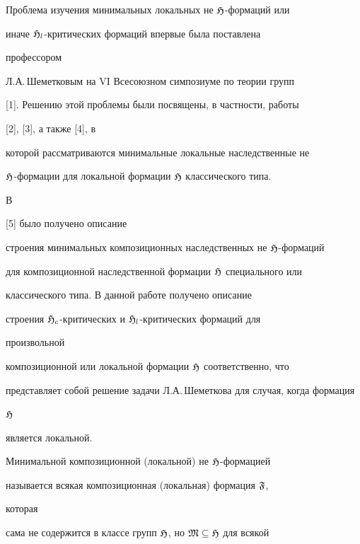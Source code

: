 \maketitle 


\label{begin} 


 


Проблема изучения минимальных локальных не $\frak H$-формаций или 


иначе $\frak H_l$-критических формаций впервые была поставлена 


профессором 


Л.А.\,Шеметковым на VI Всесоюзном симпозиуме по теории групп 


[1]. Решению этой проблемы были посвящены, в частности, работы


[2], [3], а также [4], в 


которой рассматриваются минимальные локальные наследственные не 


$\frak H$-формации для локальной формации $\frak H$ классического типа. 


В 


[5] было получено описание 


строения минимальных композиционных наследственных не $\frak 


H$-формаций 


для композиционной наследственной формации $\frak H$ специального или 


классического типа. В данной работе получено описание 


строения $\frak H_c$-критических и $\frak H_l$-критических формаций для 


произвольной 


композиционной или локальной формации $\frak H$ соответственно, что


представляет собой решение задачи Л.А.\,Шеметкова для случая, когда формация 


$\frak H$ 


является локальной. 


 


Минимальной композиционной (локальной) не $\frak H$-формацией 


называется всякая композиционная (локальная) формация $\frak F$, 


которая 


сама не содержится в классе групп $\frak H$, но $\frak M\subseteq\frak 


H$ для всякой 


